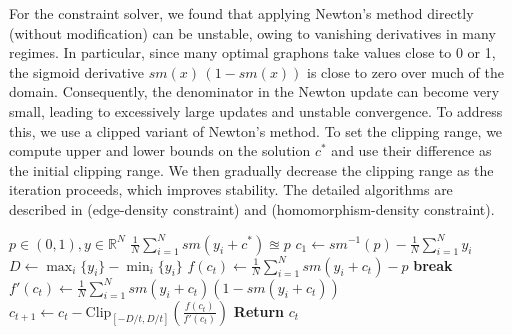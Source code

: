 \documentclass{article}
\theoremstyle{plain}
\theoremstyle{definition}
\theoremstyle{remark}
\newcommand*{\R}{\mathbb{R}}
\begin{document}
For the constraint solver, we found that applying Newton's method directly (without modification) can be unstable, owing to vanishing derivatives in many regimes.
In particular, since many optimal graphons take values close to 0 or 1, the sigmoid derivative $\mathit{sm}(x)\,(1-\mathit{sm}(x))$ is close to zero over much of the domain.
Consequently, the denominator in the Newton update can become very small, leading to excessively large updates and unstable convergence.
To address this, we use a clipped variant of Newton's method. To set the clipping range, we compute upper and lower bounds on the solution $c^*$ and use their difference as the initial clipping range.
We then gradually decrease the clipping range as the iteration proceeds, which improves stability.
The detailed algorithms are described in  (edge-density constraint) and  (homomorphism-density constraint).

\begin{algorithm}
  \caption{Edge-Density Constraint Solver}\label{alg:cap}
  \begin{algorithmic}
    \REQUIRE $p \in (0, 1), y \in \R^N$
    \ENSURE $\frac{1}{N} \sum_{i=1}^N \mathit{sm}(y_i + c^*) \approxeq p$
    \STATE $c_1 \gets \mathit{sm}^{-1}(p) - \frac{1}{N} \sum_{i=1}^N y_i$ \hfill {}
    \STATE $D \gets \max_i \{y_i\} - \min_i \{y_i\}$ \hfill {}
      \STATE $f(c_t) \gets \frac{1}{N} \sum_{i=1}^N \mathit{sm}(y_i + c_t) - p$ 
        \STATE \textbf{break} 
      \ENDIF 
      \STATE $f'(c_t) \gets \frac{1}{N} \sum_{i=1}^N \mathit{sm}(y_i + c_t) (1 - \mathit{sm}(y_i + c_t))$
      \STATE $c_{t+1} \gets c_t - \mathrm{Clip}_{[-D/t, D/t]}\left(\frac{f(c_t)}{f'(c_t)}\right)$ \hfill {}
    \ENDFOR
    \STATE \textbf{Return} $c_t$
  \end{algorithmic}
\end{algorithm}
\end{document}
